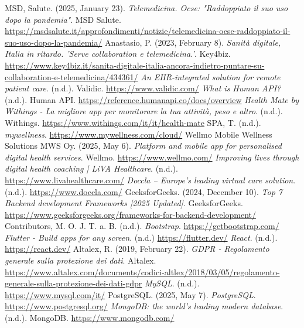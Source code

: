 \documentclass[12pt,a4paper,oneside]{report}
\begin{document}
\begingroup
\begin{thebibliography}{99}
     MSD, Salute. (2025, January 23). \textit{Telemedicina. Ocse: "Raddoppiato il suo uso dopo la pandemia"}. MSD Salute. \url{https://msdsalute.it/approfondimenti/notizie/telemedicina-ocse-raddoppiato-il-suo-uso-dopo-la-pandemia/}
     Anastasio, P. (2023, February 8). \textit{Sanità digitale, Italia in ritardo. 'Serve collaboration e telemedicina.'}. Key4biz. \url{https://www.key4biz.it/sanita-digitale-italia-ancora-indietro-puntare-su-collaboration-e-telemedicina/434361/}
     \textit{An EHR-integrated solution for remote patient care}. (n.d.). Validic. \url{https://www.validic.com/}
     \textit{What is Human API?} (n.d.). Human API. \url{https://reference.humanapi.co/docs/overview}
     \textit{Health Mate by Withings - La migliore app per monitorare la tua attività, peso e altro}. (n.d.). Withings. \url{https://www.withings.com/it/it/health-mate}
     SPA, T. (n.d.). \textit{mywellness}. \url{https://www.mywellness.com/cloud/}
     Wellmo Mobile Wellness Solutions MWS Oy. (2025, May 6). \textit{Platform and mobile app for personalised digital health services}. Wellmo. \url{https://www.wellmo.com/}
     \textit{Improving lives through digital health coaching | LiVA Healthcare}. (n.d.). \url{https://www.livahealthcare.com/}
     \textit{Doccla – Europe's leading virtual care solution}. (n.d.). \url{https://www.doccla.com/}
     GeeksforGeeks. (2024, December 10). \textit{Top 7 Backend development Frameworks [2025 Updated]}. GeeksforGeeks. \url{https://www.geeksforgeeks.org/frameworks-for-backend-development/}
     Contributors, M. O. J. T. a. B. (n.d.). \textit{Bootstrap}. \url{https://getbootstrap.com/}
     \textit{Flutter - Build apps for any screen}. (n.d.) \url{https://flutter.dev/}
     \textit{React}. (n.d.). \url{https://react.dev/}
     Altalex, R. (2019, February 22). \textit{GDPR - Regolamento generale sulla protezione dei dati}. Altalex. \url{https://www.altalex.com/documents/codici-altlex/2018/03/05/regolamento-generale-sulla-protezione-dei-dati-gdpr}
     \textit{MySQL}. (n.d.). \url{https://www.mysql.com/it/}
     PostgreSQL. (2025, May 7). \textit{PostgreSQL}. \url{https://www.postgresql.org/}
     \textit{MongoDB: the world’s leading modern database}. (n.d.). MongoDB. \url{https://www.mongodb.com/}

\end{thebibliography}
\end{document}
